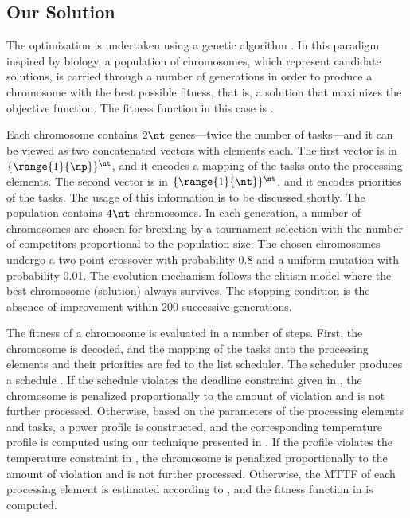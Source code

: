 \subsection{Our Solution}

The optimization is undertaken using a genetic algorithm \cite{schmitz2004}. In
this paradigm inspired by biology, a population of chromosomes, which represent
candidate solutions, is carried through a number of generations in order to
produce a chromosome with the best possible fitness, that is, a solution that
maximizes the objective function. The fitness function in this case is
.

Each chromosome contains $2 \nt$ genes---twice the number of tasks---and it can
be viewed as two concatenated vectors with \nt elements each. The first vector
is in $\{ \range{1}{\np} \}^\nt$, and it encodes a mapping of the tasks onto the
processing elements. The second vector is in $\{ \range{1}{\nt} \}^\nt$, and it
encodes priorities of the tasks. The usage of this information is to be
discussed shortly. The population contains $4 \nt$ chromosomes. In each
generation, a number of chromosomes are chosen for breeding by a tournament
selection with the number of competitors proportional to the population size.
The chosen chromosomes undergo a two-point crossover with probability 0.8 and a
uniform mutation with probability 0.01. The evolution mechanism follows the
elitism model where the best chromosome (solution) always survives. The stopping
condition is the absence of improvement within 200 successive generations.

The fitness of a chromosome is evaluated in a number of steps. First, the
chromosome is decoded, and the mapping of the tasks onto the processing elements
and their priorities are fed to the list scheduler. The scheduler produces a
schedule \schedule. If the schedule violates the deadline constraint given in
, the chromosome is penalized proportionally
to the amount of violation and is not further processed. Otherwise, based on the
parameters of the processing elements and tasks, a power profile \mp is
constructed, and the corresponding temperature profile \mq is computed using our
technique presented in . If the profile
violates the temperature constraint in , the
chromosome is penalized proportionally to the amount of violation and is not
further processed. Otherwise, the \ac{MTTF} of each processing element is
estimated according to , and the fitness
function in  is computed.

